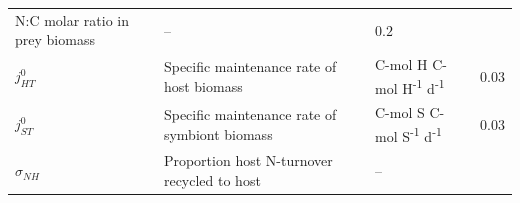\documentclass[]{elsarticle} %
\begin{document}
\begin{longtable}[]{@{}llll@{}}
\begin{minipage}[t]{0.46\columnwidth}
N:C molar ratio in prey biomass\strut
\end{minipage} & \begin{minipage}[t]{0.24\columnwidth}\raggedright\strut
--\strut
\end{minipage} & \begin{minipage}[t]{0.09\columnwidth}\raggedright\strut
\(0.2\)\strut
\end{minipage}\tabularnewline
\begin{minipage}[t]{0.09\columnwidth}\raggedright\strut
\(j_{HT}^0\)\strut
\end{minipage} & \begin{minipage}[t]{0.46\columnwidth}\raggedright\strut
Specific maintenance rate of host biomass\strut
\end{minipage} & \begin{minipage}[t]{0.24\columnwidth}\raggedright\strut
C-mol H C-mol H\textsuperscript{-1} d\textsuperscript{-1}\strut
\end{minipage} & \begin{minipage}[t]{0.09\columnwidth}\raggedright\strut
\(0.03\)\strut
\end{minipage}\tabularnewline
\begin{minipage}[t]{0.09\columnwidth}\raggedright\strut
\(j_{ST}^0\)\strut
\end{minipage} & \begin{minipage}[t]{0.46\columnwidth}\raggedright\strut
Specific maintenance rate of symbiont biomass\strut
\end{minipage} & \begin{minipage}[t]{0.24\columnwidth}\raggedright\strut
C-mol S C-mol S\textsuperscript{-1} d\textsuperscript{-1}\strut
\end{minipage} & \begin{minipage}[t]{0.09\columnwidth}\raggedright\strut
\(0.03\)\strut
\end{minipage}\tabularnewline
\begin{minipage}[t]{0.09\columnwidth}\raggedright\strut
\(\sigma_{NH}\)\strut
\end{minipage} & \begin{minipage}[t]{0.46\columnwidth}\raggedright\strut
Proportion host N-turnover recycled to host\strut
\end{minipage} & \begin{minipage}[t]{0.24\columnwidth}\raggedright\strut
--\strut
\end{minipage} & \begin{minipage}[t]{0.09\columnwidth}\raggedright\strut

\end{minipage}
\end{longtable}
\end{document}
